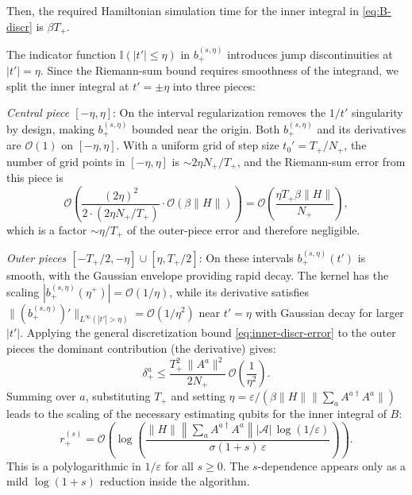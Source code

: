 \begin{enumerate}[(a)]
    Then, the required Hamiltonian simulation time for the inner integral in \eqref{eq:B-discr} is $\beta T_+$.

    The indicator function $\mathbb{I}(|t'|\leq\eta)$ in $b_+^{(s,\eta)}$ introduces jump discontinuities at $|t'| = \eta$. Since the Riemann-sum bound requires smoothness of the integrand, we split the inner integral at $t' = \pm\eta$ into three pieces:

    \textit{Central piece $[-\eta, \eta]$}: On the interval regularization removes the $1 / t'$ singularity by design, making $b_+^{(s,\eta)}$ bounded near the origin. Both $b_+^{(s,\eta)}$ and its derivatives are $\mathcal{O}(1)$ on $[-\eta,\eta]$. With a uniform grid of step size $t_0' = T_+/N_+$, the number of grid points in $[-\eta,\eta]$ is $\sim 2\eta N_+/T_+$, and the Riemann-sum error from this piece is
    $$
    \mathcal{O}\!\left(\frac{(2\eta)^2}{2\cdot (2\eta N_+/T_+)}\cdot \mathcal{O}(\beta\|H\|)\right) = \mathcal{O}\!\left(\frac{\eta T_+\beta\|H\|}{N_+}\right),
    $$
    which is a factor $\sim \eta/T_+$ of the outer-piece error and therefore negligible.

    \textit{Outer pieces $[-T_+/2, -\eta] \cup [\eta, T_+/2]$}: On these intervals $b_+^{(s,\eta)}(t')$ is smooth, with the Gaussian envelope providing rapid decay. The kernel has the scaling $|b_+^{(s,\eta)}(\eta^+)| = \mathcal{O}(1/\eta)$, while its derivative satisfies $\|(b_+^{(s,\eta)})'\|_{L^\infty(|t'|>\eta)} = \mathcal{O}(1/\eta^2)$ near $t' = \eta$ with Gaussian decay for larger $|t'|$. Applying the general discretization bound \eqref{eq:inner-discr-error} to the outer pieces the dominant contribution (the derivative) gives:
    \begin{equation}
        \delta_+^a \leq \frac{T_+^2\,\|A^a\|^2}{2N_+}\,\mathcal{O}\!\left(\frac{1}{\eta^2}\right).
    \end{equation}
    Summing over $a$, substituting $T_+$ and setting $\eta = \varepsilon/(\beta\|H\|\|\sum_a A^{a\dagger}A^a\|)$ leads to the scaling of the necessary estimating qubits for the inner integral of $B$:
    \begin{equation} \label{eq:r_+_metro}
        r_+^{(s)} = \mathcal{O}\!\left(\log\!\left(\frac{\|H\|\left\|\sum_a A^{a\dagger}A^a\right\| |\mathcal{A}|\,\log(1/\varepsilon)}{\sigma(1+s)\,\varepsilon}\right)\right).
    \end{equation}
    This is a polylogarithmic in $1 / \varepsilon$ for all $s \geq 0$. The $s$-dependence appears only as a mild $\log(1 + s)$ reduction inside the algorithm.
\end{enumerate}

